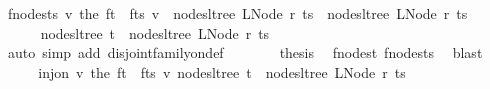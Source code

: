 \begin{isabellebody}
\ f{\isacharunderscore}{\kern0pt}nodes{\isacharunderscore}{\kern0pt}ts{\isacharprime}{\kern0pt}{\isacharcolon}{\kern0pt}\ {\isachardoublequoteopen}{\isacharparenleft}{\kern0pt}{\isasymlambda}v{\isachardot}{\kern0pt}\ the\ {\isacharparenleft}{\kern0pt}{\isacharparenleft}{\kern0pt}f{\isacharunderscore}{\kern0pt}t\ {\isacharplus}{\kern0pt}{\isacharplus}{\kern0pt}\ f{\isacharunderscore}{\kern0pt}ts{\isacharparenright}{\kern0pt}\ v{\isacharparenright}{\kern0pt}{\isacharparenright}{\kern0pt}\ {\isacharbackquote}{\kern0pt}\ nodes{\isacharunderscore}{\kern0pt}ltree\ {\isacharparenleft}{\kern0pt}LNode\ r{\isacharprime}{\kern0pt}\ ts{\isacharprime}{\kern0pt}{\isacharparenright}{\kern0pt}\ {\isasymsubseteq}\ nodes{\isacharunderscore}{\kern0pt}ltree\ {\isacharparenleft}{\kern0pt}LNode\ r\ ts{\isacharparenright}{\kern0pt}{\isachardoublequoteclose}\ \isacommand{{\isachardot}{\kern0pt}}\isamarkupfalse%
\isanewline
\isanewline
\ \ \ \ \isamarkupfalse%
\ {\isachardoublequoteopen}nodes{\isacharunderscore}{\kern0pt}ltree\ t\ {\isasyminter}\ nodes{\isacharunderscore}{\kern0pt}ltree\ {\isacharparenleft}{\kern0pt}LNode\ r\ ts{\isacharparenright}{\kern0pt}\ {\isacharequal}{\kern0pt}\ {\isacharbraceleft}{\kern0pt}{\isacharbraceright}{\kern0pt}{\isachardoublequoteclose}\ \isamarkupfalse%
\ {}{\isacharparenleft}{\kern0pt}{}{\isacharparenright}{\kern0pt}\ \isamarkupfalse%
\ {\isacharparenleft}{\kern0pt}auto\ simp\ add{\isacharcolon}{\kern0pt}\ disjoint{\isacharunderscore}{\kern0pt}family{\isacharunderscore}{\kern0pt}on{\isacharunderscore}{\kern0pt}def{\isacharparenright}{\kern0pt}\isanewline
\ \ \ \ \isamarkupfalse%
\ \isamarkupfalse%
\ {\isacharquery}{\kern0pt}thesis\ \isamarkupfalse%
\ f{\isacharunderscore}{\kern0pt}nodes{\isacharunderscore}{\kern0pt}t{\isacharprime}{\kern0pt}\ f{\isacharunderscore}{\kern0pt}nodes{\isacharunderscore}{\kern0pt}ts{\isacharprime}{\kern0pt}\ \isamarkupfalse%
\ blast\isanewline
\ \ \isamarkupfalse%
\isanewline
\ \ \isamarkupfalse%
\ \isamarkupfalse%
\ {\isachardoublequoteopen}inj{\isacharunderscore}{\kern0pt}on\ {\isacharparenleft}{\kern0pt}{\isasymlambda}v{\isachardot}{\kern0pt}\ the\ {\isacharparenleft}{\kern0pt}{\isacharparenleft}{\kern0pt}f{\isacharunderscore}{\kern0pt}t\ {\isacharplus}{\kern0pt}{\isacharplus}{\kern0pt}\ f{\isacharunderscore}{\kern0pt}ts{\isacharparenright}{\kern0pt}\ v{\isacharparenright}{\kern0pt}{\isacharparenright}{\kern0pt}\ {\isacharparenleft}{\kern0pt}nodes{\isacharunderscore}{\kern0pt}ltree\ t{\isacharprime}{\kern0pt}\ {\isasymunion}\ nodes{\isacharunderscore}{\kern0pt}ltree\ {\isacharparenleft}{\kern0pt}LNode\ r{\isacharprime}{\kern0pt}\ ts{\isacharprime}{\kern0pt}{\isacharparenright}{\kern0pt}{\isacharparenright}{\kern0pt}{\isachardoublequoteclose}\ \isamarkupfalse%

\end{isabellebody}
